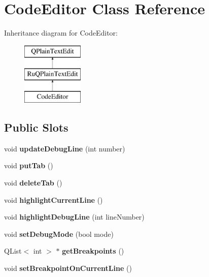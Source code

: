 \hypertarget{class_code_editor}{}\section{Code\+Editor Class Reference}
\label{class_code_editor}
Inheritance diagram for Code\+Editor\+:\begin{figure}[H]
\begin{center}
\leavevmode
\includegraphics[height=3.000000cm]{class_code_editor}
\end{center}
\end{figure}
\subsection*{Public Slots}
\begin{DoxyCompactItemize}
\item 
\hypertarget{class_code_editor_ab460ede1cca49e5ba6e0d040efa2c00c}{}void {\bfseries update\+Debug\+Line} (int number)\label{class_code_editor_ab460ede1cca49e5ba6e0d040efa2c00c}

\item 
\hypertarget{class_code_editor_a93458bc38ed83c7501c1387a43252b1d}{}void {\bfseries put\+Tab} ()\label{class_code_editor_a93458bc38ed83c7501c1387a43252b1d}

\item 
\hypertarget{class_code_editor_a3bbced4ed50a16bb1ff830373a380464}{}void {\bfseries delete\+Tab} ()\label{class_code_editor_a3bbced4ed50a16bb1ff830373a380464}

\item 
\hypertarget{class_code_editor_a8d0bbb48f1f7ad273dba6e31f0b5f28b}{}void {\bfseries highlight\+Current\+Line} ()\label{class_code_editor_a8d0bbb48f1f7ad273dba6e31f0b5f28b}

\item 
\hypertarget{class_code_editor_aa38000763f508e8072ae87da7c56c8c7}{}void {\bfseries highlight\+Debug\+Line} (int line\+Number)\label{class_code_editor_aa38000763f508e8072ae87da7c56c8c7}

\item 
\hypertarget{class_code_editor_a020ee3dd5ffe336542199c4673846158}{}void {\bfseries set\+Debug\+Mode} (bool mode)\label{class_code_editor_a020ee3dd5ffe336542199c4673846158}

\item 
\hypertarget{class_code_editor_acf16c6a80c8403a2b51c1ac216d8dfef}{}Q\+List$<$ int $>$ $\ast$ {\bfseries get\+Breakpoints} ()\label{class_code_editor_acf16c6a80c8403a2b51c1ac216d8dfef}

\item 
\hypertarget{class_code_editor_ab9bd75edacef39851e1b6a2e149c2225}{}void {\bfseries set\+Breakpoint\+On\+Current\+Line} ()\label{class_code_editor_ab9bd75edacef39851e1b6a2e149c2225}

\end{DoxyCompactItemize}
